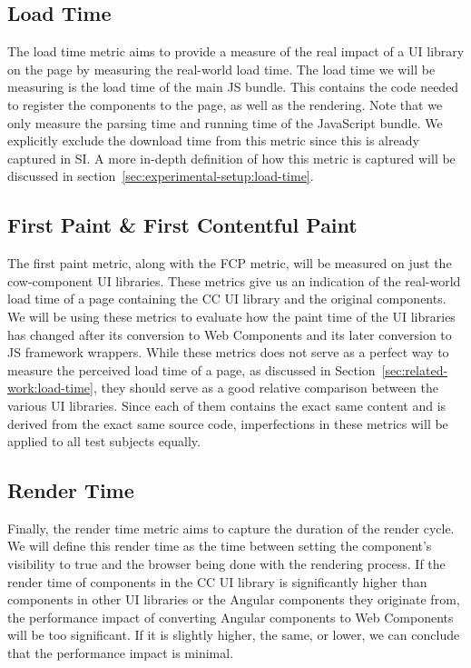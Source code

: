 \subsection{Load Time}
The load time metric aims to provide a measure of the real impact of a UI library on the page by measuring the real-world load time. The load time we will be measuring is the load time of the main JS bundle. This contains the code needed to register the components to the page, as well as the rendering. Note that we only measure the parsing time and running time of the JavaScript bundle. We explicitly exclude the download time from this metric since this is already captured in SI\@. A more in-depth definition of how this metric is captured will be discussed in section~\ref{sec:experimental-setup:load-time}.

\subsection{First Paint \& First Contentful Paint}
The first paint metric, along with the FCP metric, will be measured on just the cow-component UI libraries. These metrics give us an indication of the real-world load time of a page containing the CC UI library and the original components. We will be using these metrics to evaluate how the paint time of the UI libraries has changed after its conversion to Web Components and its later conversion to JS framework wrappers. While these metrics does not serve as a perfect way to measure the perceived load time of a page, as discussed in Section~\ref{sec:related-work:load-time}, they should serve as a good relative comparison between the various UI libraries. Since each of them contains the exact same content and is derived from the exact same source code, imperfections in these metrics will be applied to all test subjects equally.

\subsection{Render Time}
Finally, the render time metric aims to capture the duration of the render cycle. We will define this render time as the time between setting the component's visibility to true and the browser being done with the rendering process. If the render time of components in the CC UI library is significantly higher than components in other UI libraries or the Angular components they originate from, the performance impact of converting Angular components to Web Components will be too significant. If it is slightly higher, the same, or lower, we can conclude that the performance impact is minimal.

